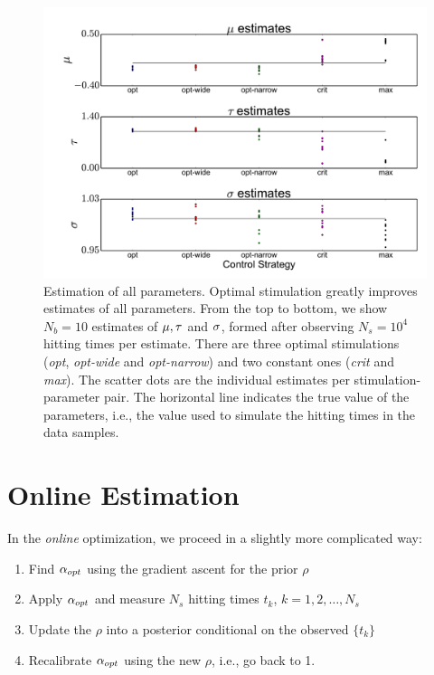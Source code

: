 \begin{figure}[htp]
\begin{center}
  \includegraphics[width=\textwidth]{Figs/MuTauSigma_Batch_estimates/all_theta_estimates_scatterplot_Nb10_Ns10000.pdf}
  \caption[Batch estimates for all 3 parameters]{Estimation of all
    parameters. Optimal stimulation greatly
  improves estimates of all parameters. 
  From the top to bottom, we show $N_b=10$ estimates of ${\mu },{ \tau }$ and $\sigma$,
  formed after observing $N_s=10^4$ hitting times per estimate. There are three optimal
  stimulations ({\em opt}, {\em opt-wide} and {\em opt-narrow}) and
  two constant ones ({\em crit} and {\em max}). The scatter dots are
  the individual estimates per 
  stimulation-parameter pair. The horizontal line indicates the true value of
  the parameters, i.e., the value used to simulate the hitting times
  in the data samples.}
  \label{fig:all_theta_estimates_batch}
\end{center}
\end{figure}


\clearpage

\section{Online Estimation}
\label{sec:online_estimation} 

In the {\sl online} optimization, we proceed in a
slightly more complicated way: 

\begin{enumerate}
  \item Find ${\alpha_{opt} }$ using the gradient ascent for the prior $\rho$
  \item Apply ${\alpha_{opt} }$ and measure $N_{s}$ hitting times
  $t_k$, $k=1,2,\ldots,N_{s}$
  \item Update the $\rho$ into a posterior conditional on the observed $\{t_k\}$
  \item Recalibrate ${\alpha_{opt} }$ using the new $\rho$, i.e., go back to 1. 
\end{enumerate}

